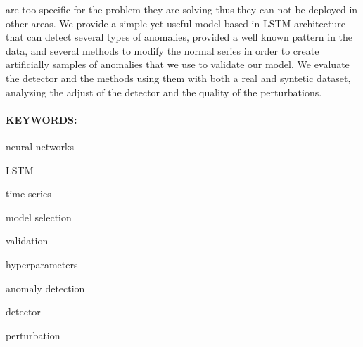 are too specific for the problem they are solving thus they can not be deployed in other areas. We provide a simple yet useful model based in LSTM architecture that can detect several types of anomalies, provided a well known pattern in the data, and several methods to modify the normal series in order to create artificially samples of anomalies that we use to validate our model. We evaluate the detector and the methods using them with both a real and syntetic dataset, analyzing the adjust of the detector and the quality of the perturbations.

\paragraph{KEYWORDS:}
\begin{itemize*}[label=,itemsep=1em,itemjoin=\hspace{1em}]
  \item neural networks
  \item LSTM
  \item time series
  \item model selection
  \item validation
  \item hyperparameters
  \item anomaly detection
  \item detector
  \item perturbation
\end{itemize*}

\endinput
